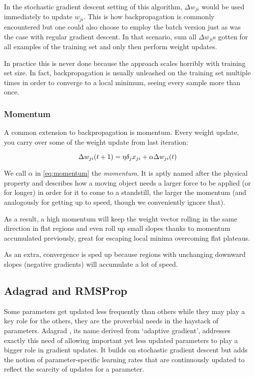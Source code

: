 In the stochastic gradient descent setting of this algorithm,
$\Delta w_{ji}$ would be used immediately to update
$w_{ji}$.
This is how backpropagation is commonly encountered
but one could also choose to employ the batch version
just as was the case with regular gradient descent.
In that scenario,
sum all $\Delta w_{ji}$s
gotten for all examples of the training set
and only then perform weight updates.

In practice this is never done because the approach scales horribly
with training set size.
In fact, backpropagation is usually unleashed on the training set multiple times
in order to converge to a local minimum,
seeing every sample more than once.

\subsubsection{Momentum}
A common extension to backpropagation is momentum.
Every weight update,
you carry over some of the weight update from last iteration:

\begin{equation}
  \Delta w_{ji}(t+1) = \eta \delta_j x_{ji} + \\
  \alpha \Delta w_{ji}(t)
  \label{eq:momentum}
\end{equation}

We call $\alpha$ in \ref{eq:momentum} the \textit{momentum}.
It is aptly named after the physical property
and describes how a moving object needs a
larger force to be applied (or for longer)
in order for it to come to a standstill,
the larger the momentum
(and analogously for getting up to speed,
though we conveniently ignore that).

As a result,
a high momentum will keep the weight vector
rolling in the same direction in flat regions
and even roll up small slopes thanks to momentum
accumulated previously,
great for escaping local minima
overcoming flat plateaus.

As an extra,
convergence is sped up
because regions with unchanging downward slopes (negative gradients)
will accumulate a lot of speed.

\subsection{Adagrad and RMSProp}
\label{sub:adagrad_and_rmsprop}
Some parameters get updated less frequently than others
while they may play a key role for the others,
they are the proverbial needs in the haystack of parameters.
Adagrad \parencite{Duchi2011},
its name derived from `adaptive gradient',
addresses exactly this need of allowing important
yet less updated parameters
to play a bigger role in gradient updates.
It builds on stochastic gradient descent
but adds the notion
of parameter-specific learning rates
that are continuously updated to reflect
the scarcity of updates for a parameter.


